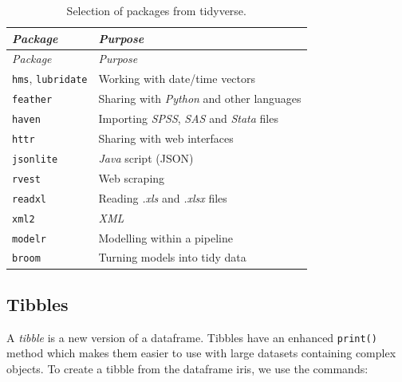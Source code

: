 \documentclass[
]{book}
\begin{document}
\begin{longtable}[]{@{}
  >{\raggedright\arraybackslash}p{}
  >{\raggedright\arraybackslash}p{}@{}}
\caption{\label{tab:TidyverseOther} Selection of packages from tidyverse.}\tabularnewline
\toprule\noalign{}
\begin{minipage}[b]{\linewidth}\raggedright
\emph{{Package}}
\end{minipage} & \begin{minipage}[b]{\linewidth}\raggedright
\emph{{Purpose}}
\end{minipage} \\
\midrule\noalign{}
\endfirsthead
\toprule\noalign{}
\begin{minipage}[b]{\linewidth}\raggedright
\emph{{Package}}
\end{minipage} & \begin{minipage}[b]{\linewidth}\raggedright
\emph{{Purpose}}
\end{minipage} \\
\midrule\noalign{}
\endhead
\bottomrule\noalign{}
\endlastfoot
\texttt{hms}, \texttt{lubridate} & Working with date/time vectors \\
\texttt{feather} & Sharing with \emph{{Python}} and other languages \\
\texttt{haven} & Importing \emph{{SPSS}}, \emph{{SAS}} and \emph{{Stata}} files \\
\texttt{httr} & Sharing with web interfaces \\
\texttt{jsonlite} & \emph{{Java}} script (JSON) \\
\texttt{rvest} & Web scraping \\
\texttt{readxl} & Reading \emph{{.xls}} and \emph{{.xlsx}} files \\
\texttt{xml2} & \emph{{XML}} \\
\texttt{modelr} & Modelling within a pipeline \\
\texttt{broom} & Turning models into tidy data \\
\end{longtable}

\subsection{Tibbles}\label{tibbles}

A \emph{{tibble}} is a new version of a dataframe. Tibbles have an enhanced \texttt{print()} method which makes them easier to use with large datasets containing complex objects. To create a tibble from the dataframe iris, we use the commands:
\end{document}
